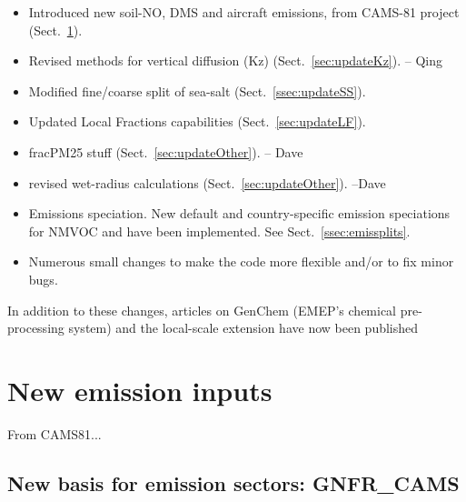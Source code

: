 
\begin{itemize}

\item Introduced new soil-NO, DMS and aircraft emissions, from CAMS-81 project
(Sect.~\ref{sec:updateEmis}). 

\item Revised methods for vertical diffusion (Kz)  (Sect.~\ref{sec:updateKz}). -- Qing

\item Modified fine/coarse split of sea-salt (Sect.~\ref{ssec:updateSS}).

\item
Updated Local Fractions capabilities (Sect.~\ref{sec:updateLF}).

\item  fracPM25 stuff (Sect.~\ref{sec:updateOther}). -- Dave
\item revised wet-radius calculations (Sect.~\ref{sec:updateOther}). --Dave


\item
Emissions speciation. New default and country-specific emission
speciations for NMVOC and \pmfine have been implemented.  See
Sect.~\ref{ssec:emissplits}.

\item
Numerous small changes to make the code more flexible and/or to
fix minor bugs.

\end{itemize}

In addition to these changes, articles on GenChem (EMEP's chemical pre-processing system)  and
the local-scale extension  have now been published \citep{Simpson:GenChem,Denby:2020}

\section{New emission inputs}
\label{sec:updateEmis}

From CAMS81...

\subsection{New basis for emission sectors: GNFR\_CAMS}
\label{ssec:gnfr}

